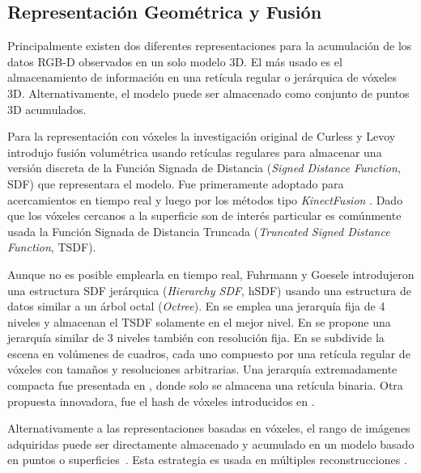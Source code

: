 \subsection{Representación Geométrica y Fusión}

Principalmente existen dos diferentes representaciones para la acumulación de los datos RGB-D observados en un solo modelo 3D. El más usado es el almacenamiento de información en una retícula regular o jerárquica de vóxeles 3D. Alternativamente, el modelo puede ser almacenado como conjunto de puntos 3D acumulados.

Para la representación con vóxeles la investigación original de Curless y Levoy \cite{curless1996volumetric} introdujo fusión volumétrica usando retículas regulares para almacenar una versión discreta de la Función Signada de Distancia (\textit{Signed Distance Function}, SDF) que representara el modelo. Fue primeramente adoptado para acercamientos en tiempo real \cite{rusinkiewicz2002real} y luego por los métodos tipo \textit{KinectFusion} \cite{izadi2011kinectfusion}. Dado que los vóxeles cercanos a la superficie son de interés particular es comúnmente usada la Función Signada de Distancia Truncada (\textit{Truncated Signed Distance Function}, TSDF).

Aunque no es posible emplearla en tiempo real, Fuhrmann y Goesele \cite{fuhrmann2011fusion} introdujeron una estructura SDF jerárquica (\textit{Hierarchy SDF}, hSDF) usando una estructura de datos similar a un árbol octal (\textit{Octree}). En \cite{zeng2012memory, zeng2013octree} se emplea una jerarquía fija de 4 niveles y almacenan el TSDF solamente en el mejor nivel. En \cite{chen2013scalable} se propone una jerarquía similar de 3 niveles también con resolución fija. En \cite{henry2013patch} se subdivide la escena en volúmenes de cuadros, cada uno compuesto por una retícula regular de vóxeles con tamaños y resoluciones arbitrarias. Una jerarquía extremadamente compacta fue presentada en \cite{reichl2016memory}, donde solo se almacena una retícula binaria. Otra propuesta innovadora, fue el hash de vóxeles introducidos en \cite{niessner2013real}.

Alternativamente a las representaciones basadas en vóxeles, el rango de imágenes adquiridas puede ser directamente almacenado y acumulado en un modelo basado en puntos o superficies~\cite{pfister2000surfels}. Esta estrategia es usada en múltiples reconstrucciones \cite{keller2013real, whelan2015elasticfusion}.

